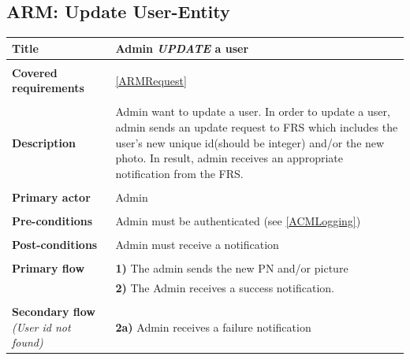 \documentclass[a4paper,11pt]{article}
\begin{document}
\subsection{ARM: Update User-Entity}

\begin{tabular}{|p{3.5cm}|p{11.5cm}|} \hline
    \textbf{Title} &   Admin \emph{UPDATE} a user

    \\ \hline \rowcolor{Gray} & \\ \hline

    \textbf{Covered requirements} &  \ref{ARMRequest}

    \\ \hline \rowcolor{Gray} & \\ \hline

    \textbf{Description} &  Admin want to update a user. In order to update a user, admin sends an update request to FRS which includes the user's new unique id(should be integer) and/or the new photo. In result, admin receives an appropriate notification from the FRS.

    \\ \hline \rowcolor{Gray} & \\ \hline

    \textbf{Primary actor} & Admin

    \\ \hline \rowcolor{Gray} & \\ \hline

    \textbf{Pre-conditions} &   Admin must be authenticated (see \ref{ACMLogging})
   
    \\ \hline \rowcolor{Gray} & \\ \hline 
   
    \textbf{Post-conditions} &   Admin must receive a notification 
   
    \\ \hline \rowcolor{Gray} & \\ \hline  
   
    \textbf{Primary flow} &  
    \textbf{1)} The admin sends the new PN and/or picture \\& 
    \textbf{2)} The Admin receives a success notification. 
   
    \\ \hline \rowcolor{Gray} & \\ \hline  
     
    \textbf{Secondary flow} \emph{(User id not found)} &  
    \textbf{2a)} Admin receives a failure notification  
   

\end{tabular}
\end{document}
